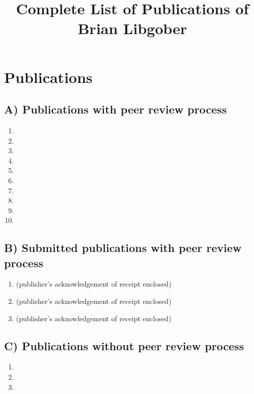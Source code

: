 \documentclass[12pt]{article}
\title{\large\bfseries Complete List of Publications of Brian Libgober}
\date{}
\begin{document}
\maketitle
\vspace{-20mm} %

\section*{Publications}

\subsection*{A) Publications with peer review process}
\begin{enumerate}
\item {}
\item {}
\item {}
\item {}
\item {}
\item {}
\item {}
\item {}
\item {}
\item {}
\end{enumerate}

\subsection*{B) Submitted publications with peer review process}
\begin{enumerate}
    \item {} (publisher's acknowledgement of receipt enclosed)
    \item {} (publisher's acknowledgement of receipt enclosed)
    \item {} (publisher's acknowledgement of receipt enclosed)
\end{enumerate}

\subsection*{C) Publications without peer review process}
\begin{enumerate}
\item {}
\item {}
\item {}
\end{enumerate}
\end{document}
